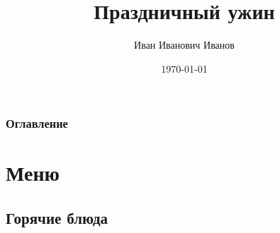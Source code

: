 \documentclass[russian]{beamer}  %
\title{Праздничный ужин}
\author{Иван Иванович Иванов}
\date{\today}
\begin{document}
	\begin{frame}
		\maketitle
	\end{frame}

	\begin{frame}
	\frametitle{Оглавление}
	\tableofcontents
	\end{frame}

	\section{Меню}
	\subsection{Горячие блюда}
\end{document}
